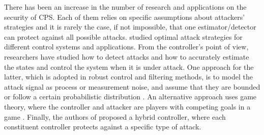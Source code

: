 \documentclass[../../thesis.tex]{subfiles}
\begin{document}
There has been an increase in the number of research and applications on the security of CPS. Each of them relies on specific assumptions about attackers' strategies and it is rarely the case, if not impossible, that one estimator/detector can protect against all possible attacks. 
\cite{Tong}\cite{KwonACC}\cite{Reiter}\cite{Sastry2} studied optimal attack strategies for different control systems and applications. From the controller's point of view, researchers have studied how to detect attacks \cite{Blanke}\cite{Willsky} and how to accurately estimate the states and control the system when it is under attack. One approach for the latter, which is adopted in robust control and filtering methods, is to model the attack signal as process or measurement noise, and assume that they are bounded \cite{Zhou_Doyle} or follow a certain probabilistic distribution \cite{Bullo}\cite{Liu}.
An alternative approach uses game theory, where the controller and attacker are players with competing goals in a game \cite{Wu}\cite{Basar}\cite{Basar2}\cite{Walrand}\cite{Pappas}. Finally, the authors of \cite{KwonCDC} proposed a hybrid controller, where each constituent controller protects against a specific type of attack.
\end{document}
